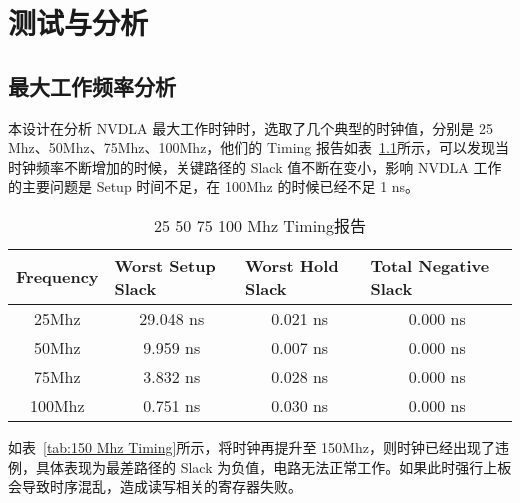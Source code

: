 \chapter{测试与分析}\label{chap:result}

\section{最大工作频率分析}

本设计在分析 NVDLA 最大工作时钟时，选取了几个典型的时钟值，分别是 25 Mhz、50Mhz、75Mhz、100Mhz，他们的 Timing 报告如表~\ref{tab:25-100 Mhz Timing}所示，可以发现当时钟频率不断增加的时候，关键路径的 Slack 值不断在变小，影响 NVDLA 工作的主要问题是 Setup 时间不足，在 100Mhz 的时候已经不足 1 ns。

\begin{table}[!htbp]
    \caption{25 50 75 100 Mhz Timing报告}
    \label{tab:25-100 Mhz Timing}
    \centering
    \footnotesize%
    \setlength{\tabcolsep}{4pt}%
    \renewcommand{\arraystretch}{1.2}%
    \begin{tabular}{cccc}
        \toprule
        \multicolumn{1}{l}{\textbf{Frequency}} & \multicolumn{1}{l}{\textbf{Worst Setup Slack}} & \multicolumn{1}{l}{\textbf{Worst Hold Slack}} & \multicolumn{1}{l}{\textbf{Total Negative Slack}} \\
        \midrule
        25Mhz                                  & 29.048 ns                                      & 0.021 ns                                      & 0.000 ns                                          \\
        50Mhz                                  & 9.959 ns                                       & 0.007 ns                                      & 0.000 ns                                          \\
        75Mhz                                  & 3.832 ns                                       & 0.028 ns                                      & 0.000 ns                                          \\
        100Mhz                                 & 0.751 ns                                       & 0.030 ns                                      & 0.000 ns                                          \\
        \bottomrule                   
    \end{tabular}
\end{table}

如表~\ref{tab:150 Mhz Timing}所示，将时钟再提升至 150Mhz，则时钟已经出现了违例，具体表现为最差路径的 Slack 为负值，电路无法正常工作。如果此时强行上板会导致时序混乱，造成读写相关的寄存器失败。

